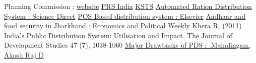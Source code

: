 \documentclass{article}
\begin{document}
\begin{thebibliography}{99}

 Planning Commission : \href{http://planningcommission.nic.in/plans/planrel/fiveyr/10th/volume2/v2_ch3_4.pdf}{website}
 \href{http://www.prsindia.org/administrator/uploads/general/1388728622~~TPDS%20Thematic%20Note.pdf}{PRS India}
 \href{http://www.kscst.iisc.ernet.in/spp/41_series/40S_bestprojreports/40S_BE_0366.pdf}{KSTS}
 \href{https://ac.els-cdn.com/S1877050915003324/1-s2.0-S1877050915003324-main.pdf?_tid=9ac7b378-d73e-435a-8ff6-14051bf3e25c&acdnat=1524581743_16e91753752ba258816d70c10d11c6c3}{Automated Ration Distribution System : Science Direct}
 \href{https://geleservices.com/GEL/Download/RFP-POS%20.pdf}{POS Based distribution system : Elsevier}
 \href{http://www.epw.in/journal/2017/50/special-articles/aadhaar-and-food-security-jharkhand.html}{Aadhaar and food security in Jharkhand : Economics and Political Weekly}
 Khera R, (2011) India's Public Distribution System: Utilisation and Impact. The Journal of Development Studies 47 (7), 1038-1060
 \href{http://www.ijsrd.com/articles/IJSRDV4I90439.pdf}{Major Drawbacks of PDS : .Mahalingam, Akash Raj D}


\end{thebibliography}
\end{document}
